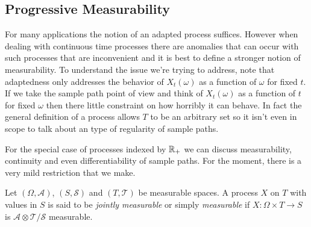 \subsection{Progressive Measurability}
For many applications the notion of an adapted process
suffices.  However when dealing with continuous time processes there
are anomalies that can occur with such processes that are inconvenient
and it is best to define a stronger notion of measurability.  To
understand the issue we're trying to address, note that adaptedness only addresses the behavior of
$X_t(\omega)$ as a function of $\omega$ for fixed $t$.  If we take the
sample path point of view and think of $X_t(\omega)$ as a function of
$t$ for fixed $\omega$ then there little constraint on how horribly it
can behave.  In fact the general definition of a process allows $T$ to
be an arbitrary set so it isn't even in scope to talk about an type of
regularity of sample paths.  

For the special case of processes indexed by $\mathbb{R}_+$ we can discuss
measurability, continuity and even differentiability of sample paths.
For the moment, there is a
very mild restriction that we make.

\begin{defn}Let $(\Omega, \mathcal{A})$, $(S, \mathcal{S})$  and
  $(T, \mathcal{T})$  be measurable spaces.  A process $X$ on $T$ with
  values in $S$ is said to be \emph{jointly
    measurable} or simply \emph{measurable} if $X : \Omega \times T
  \to S$ is $\mathcal{A} \otimes \mathcal{T}/\mathcal{S}$ measurable.
\end{defn}


